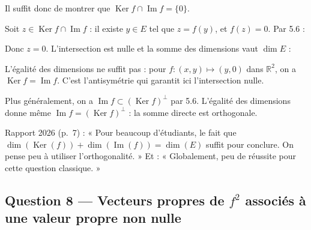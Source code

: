 \documentclass[11pt,a4paper]{article}
\newcommand{\equationajustee}[1]{%
  \sbox{\boiteequation}{$\displaystyle #1$}%
  \ifdim\wd\boiteequation>\linewidth
    \[\resizebox{\linewidth}{!}{\usebox{\boiteequation}}\]%
  \else
    \[#1\]%
  \fi}
\begin{document}
Il suffit donc de montrer que \(\operatorname{Ker}f\cap\operatorname{Im}f=\{0\}\).

Soit \(z\in\operatorname{Ker}f\cap\operatorname{Im}f\) : il existe \(y\in E\) tel que \(z=f(y)\), et \(f(z)=0\). Par 5.6 :

\equationajustee{\begin{aligned}
\|z\|^2&=(f(y)\mid z)\\
&=-(y\mid f(z))\\
&=-(y\mid0)\\
&=0.
\end{aligned}}

Donc \(z=0\). L'intersection est nulle et la somme des dimensions vaut \(\dim E\) :

\equationajustee{\boxed{E=\operatorname{Ker}(f)\oplus\operatorname{Im}(f)}}

\begin{piege}

L'égalité des dimensions ne suffit pas : pour \(f:(x,y)\mapsto(y,0)\) dans \(\mathbb R^2\), on a \(\operatorname{Ker}f=\operatorname{Im}f\). C'est l'antisymétrie qui garantit ici l'intersection nulle.

\end{piege}

\begin{methode}

Plus généralement, on a \(\operatorname{Im}f\subset(\operatorname{Ker}f)^\perp\) par 5.6. L'égalité des dimensions donne même \(\operatorname{Im}f=(\operatorname{Ker}f)^\perp\) : la somme directe est orthogonale.

\end{methode}

\begin{jury}

Rapport 2026 (p.~7) : « Pour beaucoup d'étudiants, le fait que \(\dim(\operatorname{Ker}(f))+\dim(\operatorname{Im}(f))=\dim(E)\) suffit pour conclure. On pense peu à utiliser l'orthogonalité. » Et : « Globalement, peu de réussite pour cette question classique. »

\end{jury}

\hypertarget{question-8-vecteurs-propres-de-f2-associuxe9s-uxe0-une-valeur-propre-non-nulle}{%
\subsection{\texorpdfstring{Question 8 --- Vecteurs propres de \(f^2\) associés à une valeur propre non nulle}{Question 8 --- Vecteurs propres de f\^{}2 associés à une valeur propre non nulle}}\label{question-8-vecteurs-propres-de-f2-associuxe9s-uxe0-une-valeur-propre-non-nulle}}
\end{document}
